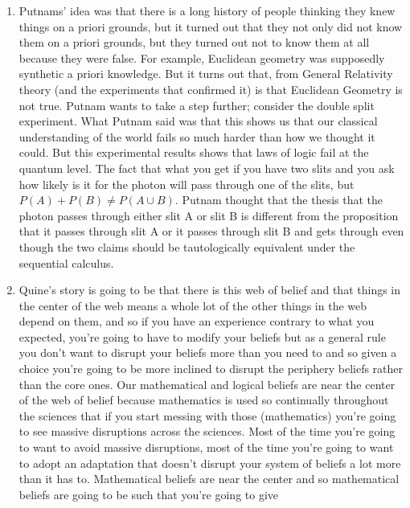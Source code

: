 \documentclass[12pt]{article}
\theoremstyle{definition}
\begin{document}
\begin{enumerate}
    \item
        Putnams' idea was that there is a long history of people thinking they
        knew things on a priori grounds, but it turned out that they not only
        did not know them on a priori grounds, but they turned out not to know
        them at all because they were false. For example, Euclidean geometry
        was supposedly synthetic a priori knowledge. But it turns out that,
        from General Relativity theory (and the experiments that confirmed it)
        is that Euclidean Geometry is not true. Putnam wants to take a step
        further; consider the double split experiment. What Putnam said was
        that this shows us that our classical understanding of the world fails
        so much harder than how we thought it could. But this experimental
        results shows that laws of logic fail at the quantum level. The fact
        that what you get if you have two slits and you ask how likely is it
        for the photon will pass through one of the slits, but $P(A) + P(B) \ne
        P(A \cup B)$. Putnam thought that the thesis that the photon passes
        through either slit A or slit B is different from the proposition that
        it passes through slit A or it passes through slit B and gets through
        even though the two claims should be tautologically equivalent under
        the sequential calculus.
    \item
        Quine's story is going to be that there is this web of belief and that
        things in the center of the web means a whole lot of the other things
        in the web depend on them, and so if you have an experience contrary to
        what you expected, you're going to have to modify your beliefs but as a
        general rule you don't want to disrupt your beliefs more than you need
        to and so given a choice you're going to be more inclined to disrupt
        the periphery beliefs rather than the core ones. Our mathematical and
        logical beliefs are near the center of the web of belief because
        mathematics is used so continually throughout the sciences that if you
        start messing with those (mathematics) you're going to see massive
        disruptions across the sciences. Most of the time you're going to want
        to avoid massive disruptions, most of the time you're going to want to
        adopt an adaptation that doesn't disrupt your system of beliefs a lot
        more than it has to. Mathematical beliefs are near the center and so
        mathematical beliefs are going to be such that you're going to give

\end{enumerate}
\end{document}
